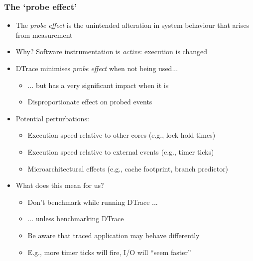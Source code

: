 \begin{frame}
  \frametitle{The `probe effect'}

  \begin{itemize}
    \item The \textit{probe effect} is the unintended alteration in system
      behaviour that arises from measurement
    \item Why?  Software instrumentation is \textit{active}: execution is
      changed

    \pause
    \medskip

    \item DTrace minimises \textit{probe effect} when not being used...
    \begin{itemize}
      \item ... but has a very significant impact when it is
      \item Disproportionate effect on probed events
    \end{itemize}

    \pause
    \medskip

    \item Potential perturbations:
    \begin{itemize}
      \item Execution speed relative to other cores (e.g., lock hold times)
      \item Execution speed relative to external events (e.g., timer ticks)
      \item Microarchitectural effects (e.g., cache footprint, branch predictor)
    \end{itemize}

    \pause
    \medskip

    \item What does this mean for us?
    \begin{itemize}
      \item Don't benchmark while running DTrace ...
      \item ... unless benchmarking DTrace
      \item Be aware that traced application may behave differently
      \item E.g., more timer ticks will fire, I/O will ``seem faster''
    \end{itemize}

  \end{itemize}
\end{frame}

